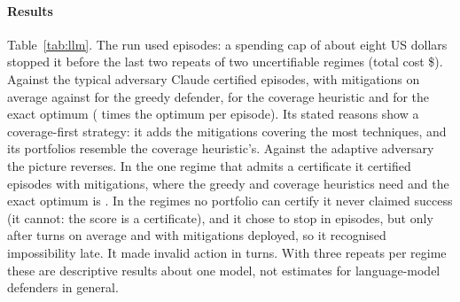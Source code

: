 \paragraph{Results} Table~\ref{tab:llm}. The run used \ClEpisodes{} episodes: a spending
cap of about eight US dollars stopped it before the last two repeats of two uncertifiable
regimes (total cost \$\ClCost{}). Against the typical adversary Claude certified
\ClTypCert{} episodes, with \ClTypMean{} mitigations on average against \ClTypGreedyMean{}
for the greedy defender, \ClTypCoverageMean{} for the coverage heuristic and
\ClTypOptMean{} for the exact optimum (\ClTypRatio{} times the optimum per episode). Its
stated reasons show a coverage-first strategy: it adds the mitigations covering the most
techniques, and its portfolios resemble the coverage heuristic's. Against the adaptive
adversary the picture reverses. In the one regime that admits a certificate it certified
\ClAdaptCert{} episodes with \ClAdaptRange{} mitigations, where the greedy and coverage
heuristics need \ClAdaptGreedy{} and the exact optimum is \ClAdaptOpt. In the regimes no
portfolio can certify it never claimed success (it cannot: the score is a certificate),
and it chose to stop in \ClUncertStop{} episodes, but only after \ClUncertSteps{} turns on
average and with \ClUncertDeployed{} mitigations deployed, so it recognised impossibility
late. It made \ClInvalidCount{} invalid action in \ClSteps{} turns. With three repeats per
regime these are descriptive results about one model, not estimates for language-model
defenders in general.
